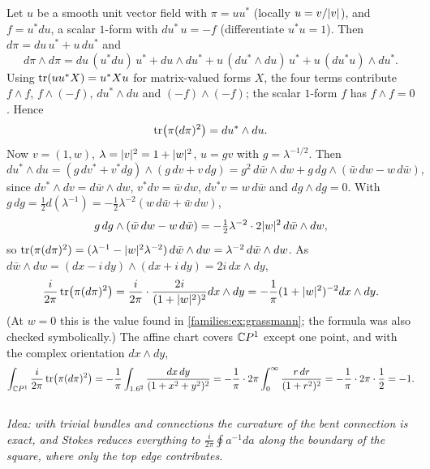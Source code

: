 Let $u$ be a smooth unit vector field with $\pi=uu^*$ (locally $u=v/\lvert v\rvert$), and
$f=u^*du$, a scalar $1$-form with $du^*\,u=-f$ (differentiate $u^*u=1$). Then
$d\pi=du\,u^*+u\,du^*$ and
\begin{equation*}
d\pi\wedge d\pi=du\,(u^*du)\,u^*+du\wedge du^*+u\,(du^*\wedge du)\,u^*+u\,(du^*u)\wedge du^* .
\end{equation*}
Using $\operatorname{tr}(uu^*X)=u^*Xu$ for matrix-valued forms $X$, the four terms contribute
$f\wedge f$, $f\wedge(-f)$, $du^*\wedge du$ and $(-f)\wedge(-f)$; the scalar $1$-form
$f$ has $f\wedge f=0$. Hence
\begin{equation*}
\operatorname{tr}\bigl(\pi(d\pi)^2\bigr)=du^*\wedge du .
\end{equation*}
Now $v=(1,w)$, $\lambda=\lvert v\rvert^2=1+\lvert w\rvert^2$, $u=gv$ with $g=\lambda^{-1/2}$. Then
\begin{equation*}
du^*\wedge du=(g\,dv^*+v^*dg)\wedge(g\,dv+v\,dg)
=g^2\,d\bar w\wedge dw+g\,dg\wedge(\bar w\,dw-w\,d\bar w),
\end{equation*}
since $dv^*\wedge dv=d\bar w\wedge dw$, $v^*dv=\bar w\,dw$, $dv^*v=w\,d\bar w$ and
$dg\wedge dg=0$. With $g\,dg=\frac12d(\lambda^{-1})=-\frac12\lambda^{-2}(w\,d\bar w+\bar
w\,dw)$,
\begin{equation*}
g\,dg\wedge(\bar w\,dw-w\,d\bar w)=-\tfrac12\lambda^{-2}\cdot2\lvert w\rvert^2\,d\bar w\wedge dw,
\end{equation*}
so $\operatorname{tr}(\pi(d\pi)^2)=(\lambda^{-1}-\lvert w\rvert^2\lambda^{-2})\,d\bar w\wedge dw=
\lambda^{-2}\,d\bar w\wedge dw$. As $d\bar w\wedge dw=(dx-i\,dy)\wedge(dx+i\,dy)=
2i\,dx\wedge dy$,
\begin{equation*}
\frac{i}{2\pi}\operatorname{tr}\bigl(\pi(d\pi)^2\bigr)=\frac{i}{2\pi}\cdot\frac{2i}{(1+\lvert w\rvert^2)^2}
dx\wedge dy=-\frac1\pi(1+\lvert w\rvert^2)^{-2}dx\wedge dy .
\end{equation*}
(At $w=0$ this is the value found in \cref{families:ex:grassmann}; the formula was
also checked symbolically.) The affine chart covers $\mathbb{C} P^1$ except one point, and
with the complex orientation $dx\wedge dy$,
\begin{equation*}
\int_{\mathbb{C} P^1}\frac{i}{2\pi}\operatorname{tr}\bigl(\pi(d\pi)^2\bigr)=-\frac1\pi\int_{1.6^2}
\frac{dx\,dy}{(1+x^2+y^2)^2}=-\frac1\pi\cdot2\pi\int_0^\infty\frac{r\,dr}{(1+r^2)^2}
=-\frac1\pi\cdot2\pi\cdot\frac12=-1 .
\end{equation*}

\subsection*{}
\emph{Idea: with trivial bundles and connections the curvature of the bent connection
is exact, and Stokes reduces everything to $\frac{i}{2\pi}\oint a^{-1}da$ along the
boundary of the square, where only the top edge contributes.}

